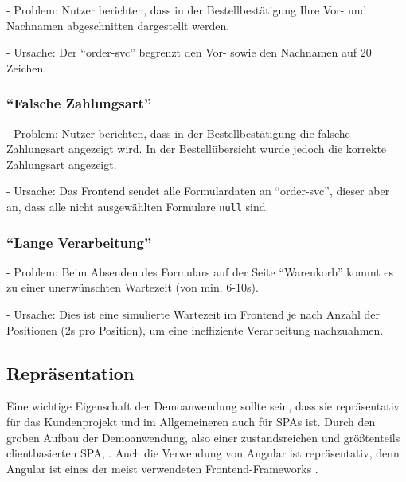 - Problem: Nutzer berichten, dass in der Bestellbestätigung Ihre Vor- und Nachnamen abgeschnitten dargestellt werden.

- Ursache: Der \enquote{order-svc} begrenzt den Vor- sowie den Nachnamen auf 20 Zeichen.

\subsubsection{\enquote{Falsche Zahlungsart}}

- Problem: Nutzer berichten, dass in der Bestellbestätigung die falsche Zahlungsart angezeigt wird. In der Bestellübersicht wurde jedoch die korrekte Zahlungsart angezeigt.

- Ursache: Das Frontend sendet alle Formulardaten an \enquote{order-svc}, dieser aber an, dass alle nicht ausgewählten Formulare \texttt{null} sind.

\subsubsection{\enquote{Lange Verarbeitung}}

- Problem: Beim Absenden des Formulars auf der Seite \enquote{Warenkorb} kommt es zu einer unerwünschten Wartezeit (von min. 6-10s).

- Ursache: Dies ist eine simulierte Wartezeit im Frontend je nach Anzahl der Positionen (2s pro Position), um eine ineffiziente Verarbeitung nachzuahmen.

\subsection{Repräsentation}

Eine wichtige Eigenschaft der Demoanwendung sollte sein, dass sie repräsentativ für das Kundenprojekt und im Allgemeineren auch für SPAs ist. Durch den groben Aufbau der Demoanwendung, also einer zustandsreichen und größtenteils clientbasierten SPA, . Auch die Verwendung von Angular ist repräsentativ, denn Angular ist eines der meist verwendeten Frontend-Frameworks \cite{TheStateOfJavaScript2020}.